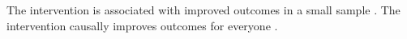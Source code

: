 \documentclass{article}
\begin{document}
The intervention is associated with improved outcomes in a small sample \citep{demo2026}.
The intervention causally improves outcomes for everyone \citep{demo2026}.
\end{document}
